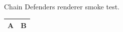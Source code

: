 \documentclass{article}
\begin{document}
Chain Defenders renderer smoke test.
\begin{longtable}{ll}\toprule A & B \\ \bottomrule\end{longtable}
\end{document}
